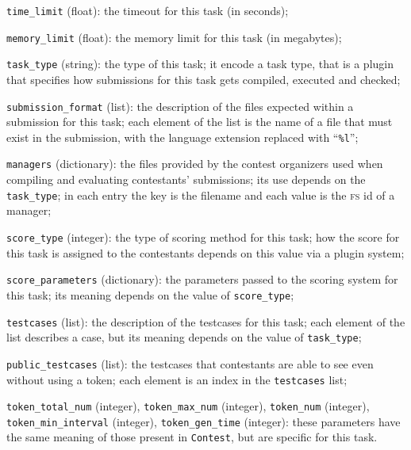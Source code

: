 \documentclass[a4paper,8pt]{amsart}
\newcommand{\FS}{\textsc{fs}}
\newenvironment{squishlist}{%
  \begin{list}{\textbullet}%
    { \setlength{\itemsep}{0pt}%
      \setlength{\parsep}{3pt}%
      \setlength{\topsep}{3pt}%
      \setlength{\partopsep}{0pt}%
      \setlength{\leftmargin}{1.5em}%
      \setlength{\labelwidth}{1em}%
      \setlength{\labelsep}{0.5em} }%
}{\end{list}}
\newcommand{\id}[1]{\texttt{#1}}
\begin{document}
\begin{multicols}{2}
\begin{squishlist}
  \item \id{time\_limit} (float): the timeout for this task (in
    seconds);

  \item \id{memory\_limit} (float): the memory limit for this task (in
    megabytes);

  \item \id{task\_type} (string): the type of this task; it encode a
    task type, that is a plugin that specifies how submissions for
    this task gets compiled, executed and checked;

  \item \id{submission\_format} (list): the description of the files
    expected within a submission for this task; each element of the
    list is the name of a file that must exist in the submission, with
    the language extension replaced with ``\texttt{\%l}'';

  \item \id{managers} (dictionary): the files provided by the contest
    organizers used when compiling and evaluating contestants'
    submissions; its use depends on the \id{task\_type}; in each entry
    the key is the filename and each value is the \FS{} id of a
    manager;

  \item \id{score\_type} (integer): the type of scoring method for
    this task; how the score for this task is assigned to the
    contestants depends on this value via a plugin system;

  \item \id{score\_parameters} (dictionary): the parameters passed to
    the scoring system for this task; its meaning depends on the value
    of \id{score\_type};

  \item \id{testcases} (list): the description of the testcases for
    this task; each element of the list describes a case, but its
    meaning depends on the value of \id{task\_type};

  \item \id{public\_testcases} (list): the testcases that contestants
    are able to see even without using a token; each element is an
    index in the \id{testcases} list;

  \item \id{token\_total\_num} (integer), \id{token\_max\_num}
    (integer), \id{token\_num} (integer), \id{token\_min\_interval}
    (integer), \id{token\_gen\_time} (integer): these parameters have
    the same meaning of those present in \id{Contest}, but are
    specific for this task.


\end{squishlist}
\end{multicols}
\end{document}

